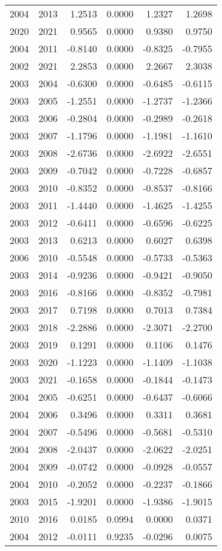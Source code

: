 \begin{tabular}{llrrrr}
2004 & 2013 & 1.2513 & 0.0000 & 1.2327 & 1.2698 \\
2020 & 2021 & 0.9565 & 0.0000 & 0.9380 & 0.9750 \\
2004 & 2011 & -0.8140 & 0.0000 & -0.8325 & -0.7955 \\
2002 & 2021 & 2.2853 & 0.0000 & 2.2667 & 2.3038 \\
2003 & 2004 & -0.6300 & 0.0000 & -0.6485 & -0.6115 \\
2003 & 2005 & -1.2551 & 0.0000 & -1.2737 & -1.2366 \\
2003 & 2006 & -0.2804 & 0.0000 & -0.2989 & -0.2618 \\
2003 & 2007 & -1.1796 & 0.0000 & -1.1981 & -1.1610 \\
2003 & 2008 & -2.6736 & 0.0000 & -2.6922 & -2.6551 \\
2003 & 2009 & -0.7042 & 0.0000 & -0.7228 & -0.6857 \\
2003 & 2010 & -0.8352 & 0.0000 & -0.8537 & -0.8166 \\
2003 & 2011 & -1.4440 & 0.0000 & -1.4625 & -1.4255 \\
2003 & 2012 & -0.6411 & 0.0000 & -0.6596 & -0.6225 \\
2003 & 2013 & 0.6213 & 0.0000 & 0.6027 & 0.6398 \\
2006 & 2010 & -0.5548 & 0.0000 & -0.5733 & -0.5363 \\
2003 & 2014 & -0.9236 & 0.0000 & -0.9421 & -0.9050 \\
2003 & 2016 & -0.8166 & 0.0000 & -0.8352 & -0.7981 \\
2003 & 2017 & 0.7198 & 0.0000 & 0.7013 & 0.7384 \\
2003 & 2018 & -2.2886 & 0.0000 & -2.3071 & -2.2700 \\
2003 & 2019 & 0.1291 & 0.0000 & 0.1106 & 0.1476 \\
2003 & 2020 & -1.1223 & 0.0000 & -1.1409 & -1.1038 \\
2003 & 2021 & -0.1658 & 0.0000 & -0.1844 & -0.1473 \\
2004 & 2005 & -0.6251 & 0.0000 & -0.6437 & -0.6066 \\
2004 & 2006 & 0.3496 & 0.0000 & 0.3311 & 0.3681 \\
2004 & 2007 & -0.5496 & 0.0000 & -0.5681 & -0.5310 \\
2004 & 2008 & -2.0437 & 0.0000 & -2.0622 & -2.0251 \\
2004 & 2009 & -0.0742 & 0.0000 & -0.0928 & -0.0557 \\
2004 & 2010 & -0.2052 & 0.0000 & -0.2237 & -0.1866 \\
2003 & 2015 & -1.9201 & 0.0000 & -1.9386 & -1.9015 \\
2010 & 2016 & 0.0185 & 0.0994 & 0.0000 & 0.0371 \\
2004 & 2012 & -0.0111 & 0.9235 & -0.0296 & 0.0075 \\
\bottomrule
\end{tabular}
